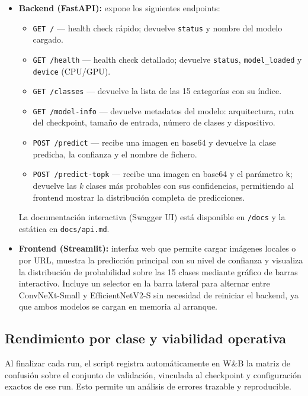 \begin{itemize}\setlength\itemsep{3pt}
    \item \textbf{Backend (FastAPI):} expone los siguientes endpoints:
    \begin{itemize}\setlength\itemsep{2pt}
        \item \texttt{GET /} — health check rápido; devuelve \texttt{status} y nombre del modelo cargado.
        \item \texttt{GET /health} — health check detallado; devuelve \texttt{status}, \texttt{model\_loaded} y \texttt{device} (CPU/GPU).
        \item \texttt{GET /classes} — devuelve la lista de las 15 categorías con su índice.
        \item \texttt{GET /model-info} — devuelve metadatos del modelo: arquitectura, ruta del checkpoint, tamaño de entrada, número de clases y dispositivo.
        \item \texttt{POST /predict} — recibe una imagen en base64 y devuelve la clase predicha, la confianza y el nombre de fichero.
        \item \texttt{POST /predict-topk} — recibe una imagen en base64 y el parámetro \texttt{k}; devuelve las \textit{k} clases más probables con sus confidencias, permitiendo al frontend mostrar la distribución completa de predicciones.
    \end{itemize}
    La documentación interactiva (Swagger UI) está disponible en \texttt{/docs} y la estática en \texttt{docs/api.md}.
    \item \textbf{Frontend (Streamlit):} interfaz web que permite cargar imágenes locales o por URL, muestra la predicción principal con su nivel de confianza y visualiza la distribución de probabilidad sobre las 15 clases mediante gráfico de barras interactivo. Incluye un selector en la barra lateral para alternar entre ConvNeXt-Small y EfficientNetV2-S sin necesidad de reiniciar el backend, ya que ambos modelos se cargan en memoria al arranque.
\end{itemize}

\subsection{Rendimiento por clase y viabilidad operativa}

Al finalizar cada run, el script registra automáticamente en W\&B la matriz de confusión sobre el conjunto de validación, vinculada al checkpoint y configuración exactos de ese run. Esto permite un análisis de errores trazable y reproducible.

